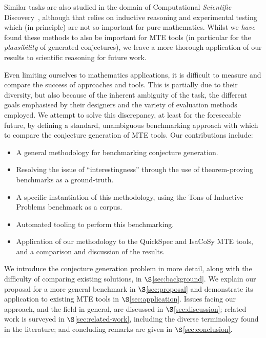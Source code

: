 Similar tasks are also studied in the domain of Computational \emph{Scientific}
Discovery~\cite{king2004functional,Williams20141289,schmidt2009distilling},
although that relies on inductive reasoning and experimental testing which (in
principle) are not so important for pure mathematics. Whilst we \emph{have}
found these methods to also be important for MTE tools (in particular for the
\emph{plausibility} of generated conjectures), we leave a more thorough
application of our results to scientific reasoning for future work.

Even limiting ourselves to mathematics applications, it is difficult to measure
and compare the success of approaches and tools. This is partially due to their
diversity, but also because of the inherent ambiguity of the task, the different
goals emphasised by their designers and the variety of evaluation methods
employed. We attempt to solve this discrepancy, at least for the foreseeable
future, by defining a standard, unambiguous benchmarking approach with which to
compare the conjecture generation of MTE tools. Our contributions include:

\begin{itemize}
\item A general methodology for benchmarking conjecture generation.
\item Resolving the issue of ``interestingness'' through the use of
  theorem-proving benchmarks as a ground-truth.
\item A specific instantiation of this methodology, using the Tons of Inductive
  Problems benchmark as a corpus.
\item Automated tooling to perform this benchmarking.
\item Application of our methodology to the QuickSpec and IsaCoSy MTE tools,
  and a comparison and discussion of the results.
\end{itemize}

We introduce the conjecture generation problem in more detail, along with the
difficulty of comparing existing solutions, in $\S$\ref{sec:background}. We explain our proposal for a more general benchmark in
$\S$\ref{sec:proposal} and demonstrate its application to existing MTE tools
in $\S$\ref{sec:application}. Issues facing our approach, and the field in
general, are discussed in $\S$\ref{sec:discussion}; related work is surveyed in
$\S$\ref{sec:related-work}, including the diverse terminology found in the
literature; and concluding remarks are given in $\S$\ref{sec:conclusion}.

